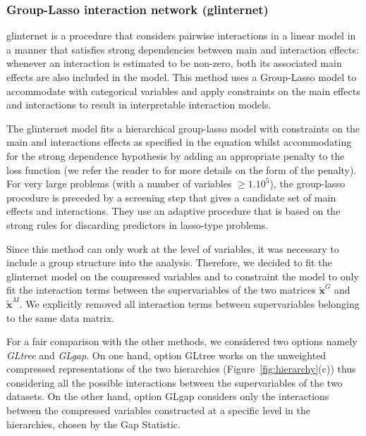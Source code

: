 \documentclass[]{book}
\begin{document}
\hypertarget{group-lasso-interaction-network-glinternet}{%
\subsubsection{Group-Lasso interaction network (glinternet)}\label{group-lasso-interaction-network-glinternet}}

glinternet \citep{lim2015learning} is a procedure that considers pairwise
interactions in a linear model in a manner that satisfies strong
dependencies between main and interaction effects: whenever an
interaction is estimated to be non-zero, both its associated main
effects are also included in the model. This method uses a Group-Lasso
model to accommodate with categorical variables and apply constraints on
the main effects and interactions to result in interpretable interaction
models.

The glinternet model fits a hierarchical group-lasso model with
constraints on the main and interactions effects as specified in the
equation whilst accommodating for the strong dependence hypothesis by
adding an appropriate penalty to the loss function (we refer the reader
to \citep{lim2015learning} for more details on the form of the penalty). For
very large problems (with a number of variables \(\geq 1.10^5\)), the
group-lasso procedure is preceded by a screening step that gives a
candidate set of main effects and interactions. They use an adaptive
procedure that is based on the strong rules \citep{tibshirani2012strong} for
discarding predictors in lasso-type problems.

Since this method can only work at the level of variables, it was
necessary to include a group structure into the analysis. Therefore, we
decided to fit the glinternet model on the compressed variables and to
constraint the model to only fit the interaction terms between the
supervariables of the two matrices \(\tilde{\mathbf{x}}^{\mathit{G}}\) and
\(\tilde{\mathbf{x}}^{\mathit{M}}\). We explicitly removed all interaction terms between
supervariables belonging to the same data matrix.

For a fair comparison with the other methods, we considered two options
namely \emph{GLtree} and \emph{GLgap}. On one hand, option GLtree works on the
unweighted compressed representations of the two hierarchies
(Figure~\ref{fig:hierarchy}(c)) thus considering all the possible
interactions between the supervariables of the two datasets. On the
other hand, option GLgap considers only the interactions between the
compressed variables constructed at a specific level in the hierarchies,
chosen by the Gap Statistic.
\end{document}
